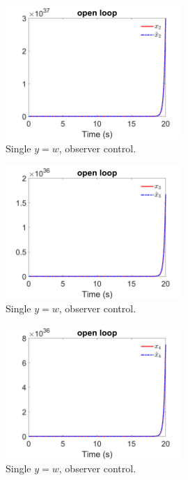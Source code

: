\documentclass[12pt]{article}
\numberwithin{equation}{section}
\begin{document}
\begin{figure}[!ht]
    \centering
    \includegraphics[width=0.6\textwidth]{single_output_observer/fig2.png}
    \caption{Single $y = w$, observer control.}
\end{figure}

\begin{figure}[!ht]
    \centering
    \includegraphics[width=0.6\textwidth]{single_output_observer/fig3.png}
    \caption{Single $y = w$, observer control.}
\end{figure}

\begin{figure}[!ht]
    \centering
    \includegraphics[width=0.6\textwidth]{single_output_observer/fig4.png}
    \caption{Single $y = w$, observer control.}
\end{figure}
\end{document}
